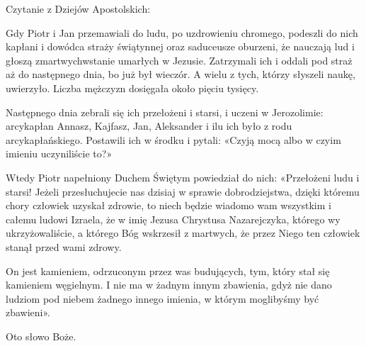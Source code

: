 \indent Czytanie z Dziejów Apostolskich:

Gdy Piotr i Jan przemawiali do ludu, po uzdrowieniu chromego, podeszli do nich kapłani i dowódca straży świątynnej oraz saduceusze oburzeni, że nauczają lud i głoszą zmartwychwstanie umarłych w Jezusie. Zatrzymali ich i oddali pod straż aż do następnego dnia, bo już był wieczór. A wielu z tych, którzy słyszeli naukę, uwierzyło. Liczba mężczyzn dosięgała około pięciu tysięcy.

Następnego dnia zebrali się ich przełożeni i starsi, i uczeni w Jerozolimie: arcykapłan Annasz, Kajfasz, Jan, Aleksander i ilu ich było z rodu arcykapłańskiego. Postawili ich w środku i pytali: «Czyją mocą albo w czyim imieniu uczyniliście to?»

Wtedy Piotr napełniony Duchem Świętym powiedział do nich: «Przełożeni ludu i starsi! Jeżeli przesłuchujecie nas dzisiaj w sprawie dobrodziejstwa, dzięki któremu chory człowiek uzyskał zdrowie, to niech będzie wiadomo wam wszystkim i całemu ludowi Izraela, że w imię Jezusa Chrystusa Nazarejczyka, którego wy ukrzyżowaliście, a którego Bóg wskrzesił z martwych, że przez Niego ten człowiek stanął przed wami zdrowy.

On jest kamieniem, odrzuconym przez was budujących, tym, który stał się kamieniem węgielnym. I nie ma w żadnym innym zbawienia, gdyż nie dano ludziom pod niebem żadnego innego imienia, w którym moglibyśmy być zbawieni».

Oto słowo Boże.